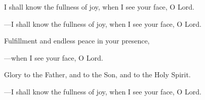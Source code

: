 \responsory
\begin{hangpar}

I shall know the fullness of joy,
when I see your face, O Lord.

{\color{red}---\thinspace}I shall know the fullness of joy,
when I see your face, O Lord.

\medskip Fulfillment and endless peace in your presence,

{\color{red}---\thinspace}when I see your face, O Lord.

\medskip Glory to the Father, and to the Son, and to the Holy Spirit.

{\color{red}---\thinspace}I shall know the fullness of joy,
when I see your face, O Lord.
\end{hangpar}
